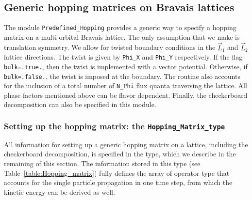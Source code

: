 %


\subsection{Generic hopping  matrices on Bravais lattices} \label{sec:predefined_hopping_1}

The module \texttt{Predefined\_Hopping}   provides a   generic way to   specify a  hopping matrix on a  multi-orbital Bravais lattice.  The only  assumption that we make is  translation symmetry.   We   allow  for twisted  boundary conditions in the $\vec{L}_1$ and $\vec{L}_2$ lattice directions. The twist is given by  \texttt{Phi\_X}  and \texttt{Phi\_Y}  respectively.  If the flag  \texttt{bulk=.true.}, then the twist is implemented with a vector potential. Otherwise, if  \texttt{bulk=.false.}, the twist is imposed at the boundary. The routine also accounts for  the inclusion of a  total number of \texttt{N\_Phi}  flux quanta traversing the lattice.  All phase factors mentioned above can be flavor dependent.   Finally, the checkerboard decomposition can also be specified in this module.


\subsubsection{Setting up the hopping matrix: the \texttt{Hopping\_Matrix\_type}}\label{sec:hopping_type}

All information for setting up a generic hopping matrix on a lattice, including the checkerboard decomposition, is specified in the   type, which we describe in the remaining of this section. The information stored in this type (see Table~\ref{table:Hopping_matrix}) fully defines the array of  operator type  that accounts for the single particle propagation in one time step, from which the kinetic energy can be derived as well.    

